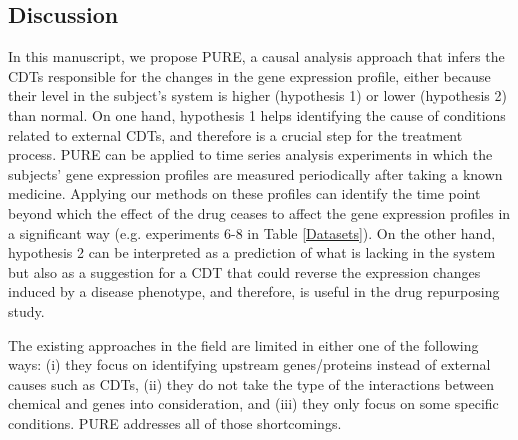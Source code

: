 %

\subsection{Discussion}

In this manuscript, we propose PURE, a causal analysis approach that infers the CDTs responsible for the changes in the gene expression profile, either because their level in the subject's system is higher (hypothesis 1) or lower (hypothesis 2) than normal. 
On one hand,  hypothesis 1 helps identifying the cause of conditions related to external CDTs, and therefore is a crucial step for the treatment process. 
PURE can be applied to time series analysis experiments in which the subjects' gene expression profiles are measured periodically after taking a known medicine. Applying our methods on these profiles can identify the time point beyond which the effect of the drug ceases to affect the gene expression profiles in a significant way  (e.g. experiments 6-8 in Table \ref{Datasets}).
On the other hand, hypothesis 2 can be interpreted as a prediction of what is lacking in the system but also as a suggestion for a CDT that could reverse the expression changes induced by a disease phenotype, and therefore, is useful in the drug repurposing study. %

The existing approaches in the field are limited in either one of the following ways: 
(i) they focus  on identifying upstream genes/proteins instead of external causes such as CDTs, (ii) they do not take the type of the interactions between chemical and genes into consideration, and (iii) they only focus on some specific conditions. PURE addresses all of those shortcomings.


